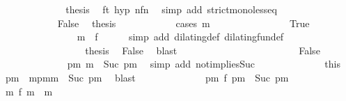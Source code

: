 \begin{isabellebody}
\ \ \ \ \ \ \ \ \ \ \isamarkupfalse%
\ \isamarkupfalse%
\ {\isacharquery}thesis\ \isamarkupfalse%
\ ft{}\ hyp\ nfn{}\ \isamarkupfalse%
\ {\isacharparenleft}simp\ add{\isacharcolon}\ strict{\isacharunderscore}mono{\isacharunderscore}less{\isacharunderscore}eq{\isacharparenright}\isanewline
\ \ \ \ \ \ \ \ \isamarkupfalse%
\isanewline
\ \ \ \ \ \ \ \ \ \ \isamarkupfalse%
\ False\ \isamarkupfalse%
\ {\isacharquery}thesis\isanewline
\ \ \ \ \ \ \ \ \ \ \isamarkupfalse%
\ {\isacharparenleft}cases\ {\isacartoucheopen}m\ {\isacharequal}\ {}{\isacartoucheclose}{\isacharparenright}\isanewline
\ \ \ \ \ \ \ \ \ \ \ \ \isamarkupfalse%
\ True\isanewline
\ \ \ \ \ \ \ \ \ \ \ \ \ \ \isamarkupfalse%
\ {\isacartoucheopen}m\ {\isacharequal}\ f\ {}{\isacartoucheclose}\ \isamarkupfalse%
\ {\isacharasterisk}\ \isamarkupfalse%
\ {\isacharparenleft}simp\ add{\isacharcolon}\ dilating{\isacharunderscore}def\ dilating{\isacharunderscore}fun{\isacharunderscore}def{\isacharparenright}\isanewline
\ \ \ \ \ \ \ \ \ \ \ \ \ \ \isamarkupfalse%
\ \isamarkupfalse%
\ {\isacharquery}thesis\ \isamarkupfalse%
\ False\ \isamarkupfalse%
\ blast\isanewline
\ \ \ \ \ \ \ \ \ \ \isamarkupfalse%
\isanewline
\ \ \ \ \ \ \ \ \ \ \ \ \isamarkupfalse%
\ False\isanewline
\ \ \ \ \ \ \ \ \ \ \ \ \isamarkupfalse%
\ {\isacartoucheopen}{\isasymexists}pm{\isachardot}\ m\ {\isacharequal}\ Suc\ pm{\isacartoucheclose}\ \isamarkupfalse%
\ {\isacharparenleft}simp\ add{\isacharcolon}\ not{}{\isacharunderscore}implies{\isacharunderscore}Suc{\isacharparenright}\isanewline
\ \ \ \ \ \ \ \ \ \ \ \ \isamarkupfalse%
\ this\ \isamarkupfalse%
\ pm\ \ mpm{\isacharcolon}{\isacartoucheopen}m\ {\isacharequal}\ Suc\ pm{\isacartoucheclose}\ \isamarkupfalse%
\ blast\isanewline
\ \ \ \ \ \ \ \ \ \ \ \ \isamarkupfalse%
\ {\isacartoucheopen}{\isasymnexists}pm\ f\ pm\ {\isacharequal}\ Suc\ pm{\isacartoucheclose}\ \isamarkupfalse%
\ {\isacartoucheopen}{\isasymnexists}m\ f\ m\ {\isacharequal}\ m{\isacartoucheclose}\ \isamarkupfalse%

\end{isabellebody}
